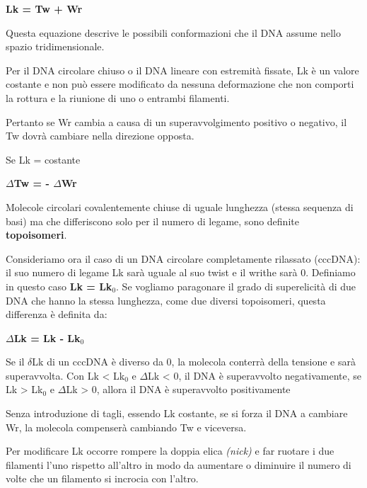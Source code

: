 \documentclass[11pt]{book}
\begin{document}
\textbf{Lk = Tw + Wr}

Questa equazione descrive le possibili conformazioni che il DNA assume
nello spazio tridimensionale.

Per il DNA circolare chiuso o il DNA lineare con estremità fissate, Lk è
un valore costante e non può essere modificato da nessuna deformazione
che non comporti la rottura e la riunione di uno o entrambi filamenti.

Pertanto se Wr cambia a causa di un superavvolgimento positivo o
negativo, il Tw dovrà cambiare nella direzione opposta.

Se Lk = costante

\textbf{\(\Delta\)Tw = - \(\Delta\)Wr}

Molecole circolari covalentemente chiuse di uguale lunghezza (stessa
sequenza di basi) ma che differiscono solo per il numero di legame, sono
definite \textbf{topoisomeri}.

Consideriamo ora il caso di un DNA circolare completamente rilassato
(cccDNA): il suo numero di legame Lk sarà uguale al suo twist e il
writhe sarà 0. Definiamo in questo caso \textbf{Lk = Lk\(_0\)}. Se
vogliamo paragonare il grado di superelicità di due DNA che hanno la
stessa lunghezza, come due diversi topoisomeri, questa differenza è
definita da:

\textbf{\(\Delta\)Lk = Lk - Lk\(_0\)}

Se il \(\delta\)Lk di un cccDNA è diverso da 0, la molecola conterrà
della tensione e sarà superavvolta. Con Lk \textless{} Lk\(_0\) e
\(\Delta\)Lk \textless{} 0, il DNA è superavvolto negativamente, se Lk
\textgreater{} Lk\(_0\) e \(\Delta\)Lk \textgreater{} 0, allora il DNA è
superavvolto positivamente

Senza introduzione di tagli, essendo Lk costante, se si forza il DNA a
cambiare Wr, la molecola compenserà cambiando Tw e viceversa.

Per modificare Lk occorre rompere la doppia elica \emph{(nick)} e far
ruotare i due filamenti l'uno rispetto all'altro in modo da aumentare o
diminuire il numero di volte che un filamento si incrocia con l'altro.
\end{document}
